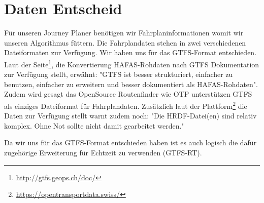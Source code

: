 \documentclass[a4paper,12pt]{scrartcl}
\begin{document}
\section{Daten Entscheid}
\label{sec:Daten Entscheid}
Für unseren Journey Planer benötigen wir Fahrplaninformationen womit wir unseren Algorithmus füttern. Die Fahrplandaten stehen in zwei verschiedenen Dateiformaten zur Verfügung. 
\newline
\newline
Wir haben uns für das GTFS-Format entschieden.
Laut der Seite\footnote{\url{http://gtfs.geops.ch/doc/}}, die Konvertierung HAFAS-Rohdaten nach GTFS Dokumentation zur Verfügung stellt, erwähnt: "GTFS ist besser strukturiert, einfacher zu benutzen, einfacher zu erweitern und besser dokumentiert als HAFAS-Rohdaten". Zudem wird gesagt das OpenSource Routenfinder wie OTP unterstützen GTFS als einziges Dateiformat für Fahrplandaten.\cite{hrdfintogtfs}
\newline
\newline
Zusätzlich laut der Plattform\footnote{\url{https://opentransportdata.swiss/}} die Daten zur Verfügung stellt warnt zudem noch: "Die HRDF-Datei(en) sind relativ komplex. Ohne Not sollte nicht damit gearbeitet werden."\cite{opentransporthrdf}

Da wir uns für das GTFS-Format entschieden haben ist es auch logisch die dafür zugehörige Erweiterung für Echtzeit zu verwenden (GTFS-RT).
\end{document}
